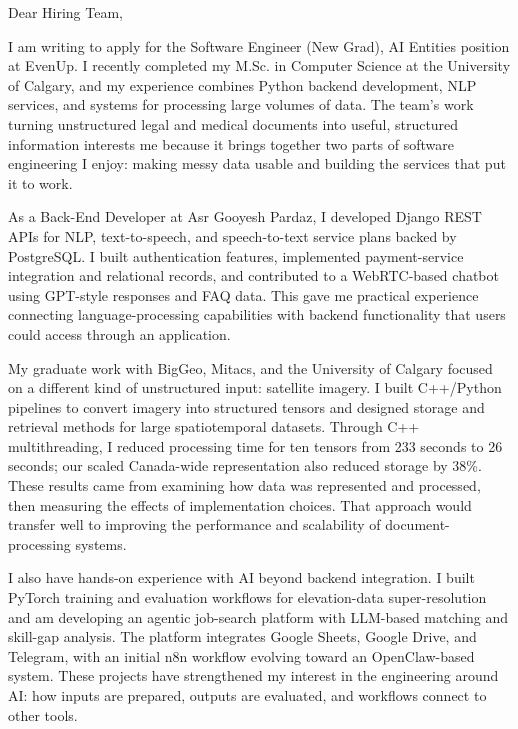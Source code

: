 \documentclass[11pt]{letter}
\begin{document}
\begin{letter}{}

\opening{Dear Hiring Team,}

I am writing to apply for the Software Engineer (New Grad), AI Entities position at EvenUp. I recently completed my M.Sc. in Computer Science at the University of Calgary, and my experience combines Python backend development, NLP services, and systems for processing large volumes of data. The team's work turning unstructured legal and medical documents into useful, structured information interests me because it brings together two parts of software engineering I enjoy: making messy data usable and building the services that put it to work.

As a Back-End Developer at Asr Gooyesh Pardaz, I developed Django REST APIs for NLP, text-to-speech, and speech-to-text service plans backed by PostgreSQL. I built authentication features, implemented payment-service integration and relational records, and contributed to a WebRTC-based chatbot using GPT-style responses and FAQ data. This gave me practical experience connecting language-processing capabilities with backend functionality that users could access through an application.

My graduate work with BigGeo, Mitacs, and the University of Calgary focused on a different kind of unstructured input: satellite imagery. I built C++/Python pipelines to convert imagery into structured tensors and designed storage and retrieval methods for large spatiotemporal datasets. Through C++ multithreading, I reduced processing time for ten tensors from 233 seconds to 26 seconds; our scaled Canada-wide representation also reduced storage by 38\%. These results came from examining how data was represented and processed, then measuring the effects of implementation choices. That approach would transfer well to improving the performance and scalability of document-processing systems.

I also have hands-on experience with AI beyond backend integration. I built PyTorch training and evaluation workflows for elevation-data super-resolution and am developing an agentic job-search platform with LLM-based matching and skill-gap analysis. The platform integrates Google Sheets, Google Drive, and Telegram, with an initial n8n workflow evolving toward an OpenClaw-based system. These projects have strengthened my interest in the engineering around AI: how inputs are prepared, outputs are evaluated, and workflows connect to other tools.


\end{letter}
\end{document}
